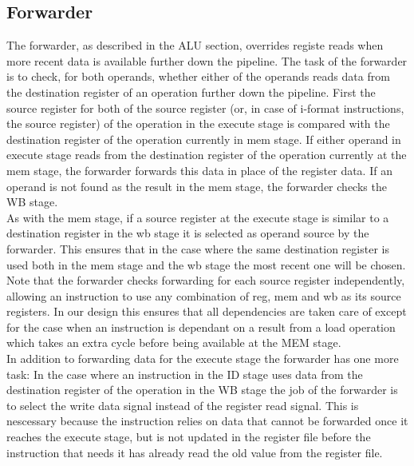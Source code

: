 \subsection{Forwarder}
\label{section:Forwarder}
The forwarder, as described in the ALU section, overrides registe reads when more recent data is available further down the pipeline.
The task of the forwarder is to check, for both operands, whether either of the operands reads data from the destination register of an operation further down the pipeline.
First the source register for both of the source register (or, in case of i-format instructions, the source register) of the operation in the execute stage is compared with the destination register of the operation currently in mem stage. 
If either operand in execute stage reads from the destination register of the operation currently at the mem stage, the forwarder forwards this data in place of the register data.
If an operand is not found as the result in the mem stage, the forwarder checks the WB stage.\\
As with the mem stage, if a source register at the execute stage is similar to a destination register in the wb stage it is selected as operand source by the forwarder. 
This ensures that in the case where the same destination register is used both in the mem stage and the wb stage the most recent one will be chosen.
Note that the forwarder checks forwarding for each source register independently, allowing an instruction to use any combination of reg, mem and wb as its source registers.
In our design this ensures that all dependencies are taken care of except for the case when an instruction is dependant on a result from a load operation which takes an extra cycle before being available at the MEM stage.\\
In addition to forwarding data for the execute stage the forwarder has one more task:
In the case where an instruction in the ID stage uses data from the destination register of the operation in the WB stage the job of the forwarder is to select the write data signal instead of the register read signal.
This is nescessary because the instruction relies on data that cannot be forwarded once it reaches the execute stage, but is not updated in the register file before the instruction that needs it has already read the old value from the register file.

